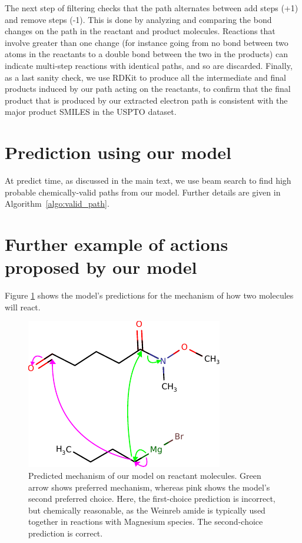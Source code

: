 The next step of filtering checks that the path alternates between add steps (+1) and remove steps (-1). 
This is done by analyzing and comparing the bond changes on the path in the reactant and product molecules. 
Reactions that involve greater than one change (for instance going from no bond between two atoms in the reactants to a double bond between the two in the products) can indicate multi-step 
reactions with identical paths, and so are discarded.
Finally, as a last sanity check, we use RDKit to produce all the intermediate and final products induced by our path acting on the reactants,
to confirm that the final product that is produced by our extracted electron path is consistent with the major product SMILES in the USPTO dataset.

\section{Prediction using our model}

At predict time, as discussed in the main text, we use beam search to find high probable chemically-valid paths from our model. Further details are given in Algorithm~\ref{algo:valid_path}.




\section{Further example of actions proposed by our model}

Figure \ref{fig:extra-textbook-example} shows the model's predictions for the mechanism of how two molecules will react. 

\begin{figure}[h]
        \centering
        \includegraphics{imgs/textbook/reactants2}
        \caption{Predicted mechanism of our model on reactant molecules. Green arrow shows preferred mechanism, whereas pink shows the model's second preferred choice. Here, the first-choice prediction is incorrect, but chemically reasonable, as the Weinreb amide is typically used together in reactions with Magnesium species. The second-choice prediction is correct.}
        \label{fig:extra-textbook-example}
\end{figure}

